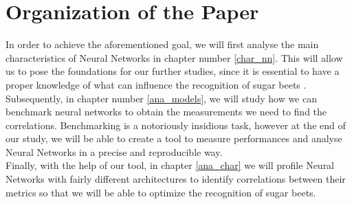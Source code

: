 \section{Organization of the Paper}
In order to achieve the aforementioned goal, we will first analyse the main characteristics of Neural Networks in chapter number \ref{char_nn}. This will allow us to pose the foundations for our further studies, since it is essential to have a proper knowledge of what can influence the recognition of sugar beets .\\
Subsequently, in chapter number \ref{ana_models}, we will study how we can benchmark neural networks to obtain the measurements we need to find the correlations. Benchmarking is a notoriously insidious task, however at the end of our study, we will be able to create a tool to measure performances and analyse Neural Networks in a precise and reproducible way.\\
Finally, with the help of our tool, in chapter \ref{ana_char} we will profile Neural Networks with fairly different architectures to identify correlations between their metrics so that we will be able to optimize the recognition of sugar beets. 

